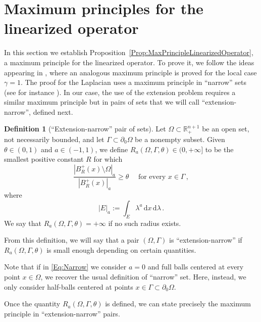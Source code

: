 \documentclass[12pt,reqno]{amsart}
\theoremstyle{definition}
\newtheorem{definition}[theorem]{Definition}
\theoremstyle{remark}
\newcommand{\con}[1]{\mathbb{#1}}
\newcommand{\R}{\con{R}} %
\newcommand{\s}{\gamma}
\renewcommand{\d}{\,\mathrm{d}} %
\newcommand{\dx}{\,\mathrm{d}x} %
\numberwithin{equation}{section}
\begin{document}
\section{Maximum principles for the linearized operator}
\label{Sec:MaximumPrinciple}

In this section we establish Proposition~\ref{Prop:MaxPrincipleLinearizedOperator}, a maximum principle for the linearized operator. To prove it, we follow the ideas appearing in \cite{Cabre-Saddle}, where an analogous maximum principle is proved for the local case $\s = 1$. The proof for the Laplacian uses a maximum principle in ``narrow'' sets (see for instance \cite{Cabre-Topics,BerestyckiNirembergVaradhan}). In our case, the use of the extension problem requires a similar maximum principle but in pairs of sets that we will call ``extension-narrow''\!, defined next.

\begin{definition}[``Extension-narrow'' pair of sets]
	Let $\Omega \subset \R^{n+1}_+$ be an open set, not necessarily bounded, and let $\Gamma \subset \partial_0 \Omega$ be a nonempty subset. Given $\theta \in (0,1)$ and $a\in (-1,1)$, we define $R_a(\Omega,\Gamma,\theta) \in (0, +\infty]$ to be the smallest positive constant $R$ for which
	\begin{equation}
	\label{Eq:Narrow}
	\dfrac{|B^+_R(x)\setminus \Omega|_a}{|B^+_R(x)|_a} \geq \theta \quad \text{ for every } x \in \Gamma\,,
	\end{equation}
	where 
	$$
	|E|_a := \int_E \lambda^a \dx \d \lambda\,.
	$$
	We say that $R_a(\Omega,\Gamma,\theta) = + \infty$ if no such radius exists.
	
	From this definition, we will say that a pair $(\Omega, \Gamma)$ is ``extension-narrow'' if $R_a(\Omega,\Gamma,\theta)$ is small enough depending on certain quantities.
\end{definition}

Note that if in \eqref{Eq:Narrow} we consider $a=0$ and full balls centered at every point $x\in \Omega$, we recover the usual definition of ``narrow'' set. Here, instead, we only consider half-balls centered at points $x\in \Gamma \subset \partial_0\Omega$.

Once the quantity  $R_a(\Omega,\Gamma, \theta)$ is defined, we can state precisely the maximum principle in ``extension-narrow'' pairs.
\end{document}
